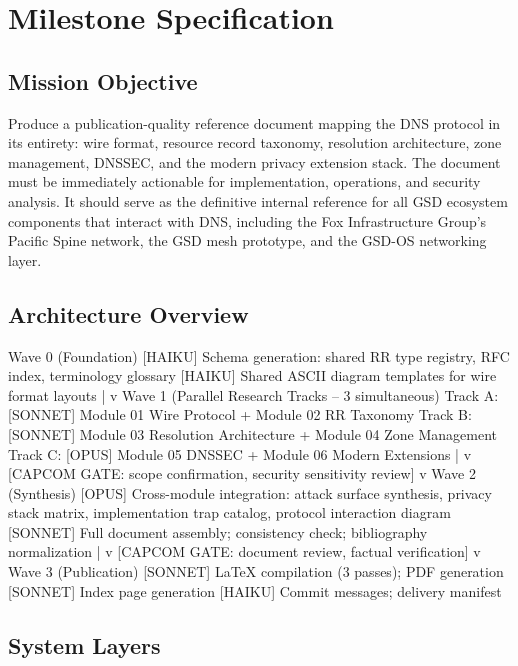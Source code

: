 \documentclass[11pt,letterpaper]{article}
\begin{document}
\section{Milestone Specification}

\subsection{Mission Objective}

Produce a publication-quality reference document mapping the DNS protocol in its entirety: wire format, resource record taxonomy, resolution architecture, zone management, DNSSEC, and the modern privacy extension stack. The document must be immediately actionable for implementation, operations, and security analysis. It should serve as the definitive internal reference for all GSD ecosystem components that interact with DNS, including the Fox Infrastructure Group's Pacific Spine network, the GSD mesh prototype, and the GSD-OS networking layer.

\subsection{Architecture Overview}

\begin{asciibox}
Wave 0 (Foundation)
  [HAIKU] Schema generation: shared RR type registry, RFC index, terminology glossary
  [HAIKU] Shared ASCII diagram templates for wire format layouts
       |
       v
Wave 1 (Parallel Research Tracks -- 3 simultaneous)
  Track A:  [SONNET] Module 01 Wire Protocol + Module 02 RR Taxonomy
  Track B:  [SONNET] Module 03 Resolution Architecture + Module 04 Zone Management
  Track C:  [OPUS]   Module 05 DNSSEC + Module 06 Modern Extensions
       |
       v    [CAPCOM GATE: scope confirmation, security sensitivity review]
       v
Wave 2 (Synthesis)
  [OPUS] Cross-module integration: attack surface synthesis, privacy stack matrix,
         implementation trap catalog, protocol interaction diagram
  [SONNET] Full document assembly; consistency check; bibliography normalization
       |
       v    [CAPCOM GATE: document review, factual verification]
       v
Wave 3 (Publication)
  [SONNET] LaTeX compilation (3 passes); PDF generation
  [SONNET] Index page generation
  [HAIKU] Commit messages; delivery manifest
\end{asciibox}

\subsection{System Layers}
\end{document}
